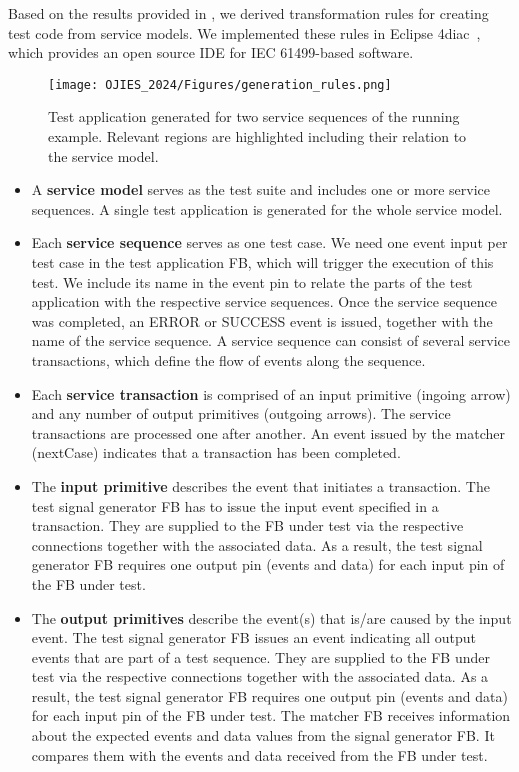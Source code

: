 Based on the results provided in \cite{Testing_Midhun,biancaMidhunETFAwip}, we derived transformation rules for creating test code from service models. We implemented these rules in Eclipse 4diac~\cite{eclipse4diac}, which provides an open source IDE for IEC 61499-based software.
\begin{figure*}
    \centering
    \texttt{[image: OJIES\_2024/Figures/generation\_rules.png]}
    \caption{Test application generated for two service sequences of the running example. Relevant regions are highlighted including their relation to the service model.}
    \label{fig::testapp}
\end{figure*}

\begin{itemize}
        \item  A \textbf{service model} serves as the test suite and includes one or more service sequences. A single test application is generated for the whole service model. 
        
        \item Each \textbf{service sequence} serves as one test case. We need one event input per test case in the test application FB, which will trigger the execution of this test. We include its name in the event pin to relate the parts of the test application with the respective service sequences. Once the service sequence was completed, an ERROR or SUCCESS event is issued, together with the name of the service sequence. A service sequence can consist of several service transactions, which define the flow of events along the sequence. 
         
         \item Each \textbf{service transaction} is comprised of an input primitive (ingoing arrow) and any number of output primitives (outgoing arrows). The service transactions are processed one after another. An event issued by the matcher (nextCase) indicates that a transaction has been completed.
        
        \item The \textbf{input primitive} describes the event that initiates a transaction. 
        The test signal generator FB has to issue the input event specified in a transaction. They are supplied to the FB under test via the respective connections together with the associated data. As a result, the test signal generator FB requires one output pin (events and data) for each input pin of the FB under test. 
        
        \item The \textbf{output primitives} describe the event(s) that is/are caused by the input event.
        The test signal generator FB issues an event indicating all output events that are part of a test sequence. They are supplied to the FB under test via the respective connections together with the associated data. As a result, the test signal generator FB requires one output pin (events and data) for each input pin of the FB under test. The matcher FB receives information about the expected events and data values from the signal generator FB. It compares them with the events and data received from the FB under test.
\end{itemize}


